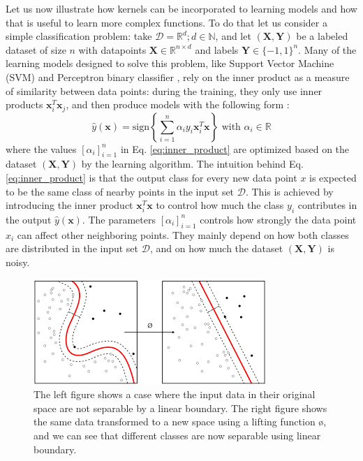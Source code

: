Let us now illustrate how kernels can be incorporated to learning models and how that is useful to learn more complex functions. To do that let us consider a simple classification problem: take $\mathcal{D}=\mathbb{R}^d; d\in\mathbb{N}$, and let $(\mathbf{X},\mathbf{Y})$ be a labeled dataset of size $n$ with datapoints $\mathbf{X}\in \mathbb{R}^{n\times d} $ and labels $\mathbf{Y}\in \{-1,1\}^n$.  Many of the learning models designed to solve this problem, like Support Vector Machine (SVM)  and Perceptron binary classifier , rely on the inner product as a measure of similarity between data points: during the training, they only use inner products $\mathbf{x}_i^T \mathbf{x}_j$, and then produce models with the following form \citep{inner_product}:
\begin{equation}
\label{eq:inner_product}
 \hat{y}(\mathbf{x})=\text{sign}\left\{\sum_{i=1}^n\alpha_iy_i\mathbf{x}_i^T\mathbf{x}\right\} \text{ with } \alpha_i\in \mathbb{R}
\end{equation}
where the values $[\alpha_i]_{i=1}^n$ in Eq. \ref{eq:inner_product} are optimized based on the dataset $(\mathbf{X,Y})$ by the learning algorithm. The intuition behind Eq. \ref{eq:inner_product} is that the output class for every new data point $x$ is expected to be the same class of nearby points in the input set $\mathcal{D}$. This is achieved by introducing the inner product $\mathbf{x}_i^T\mathbf{x}$ to control how much the class $y_i$ contributes in the output $\hat{y}(\mathbf{x})$. The parameters $[\alpha_i]_{i=1}^n$ controls how strongly the data point $x_i$ can affect other neighboring points. They mainly depend on how both classes are distributed in the input set $\mathcal{D}$, and on how much the dataset $(\mathbf{X,Y})$ is noisy. 

\begin{figure}[H]
\centering
\includegraphics[scale=0.5]{figs/svm.png}
\caption[The case where classes aren't separable using linear boundary]{The left figure shows a case where the input data in their original space are not separable by a linear boundary. The right figure shows the same data transformed to a new space using a lifting function \o, and we can see that different classes are now separable  using linear boundary.}
\label{fig:SVM_boundaries}
\end{figure}


